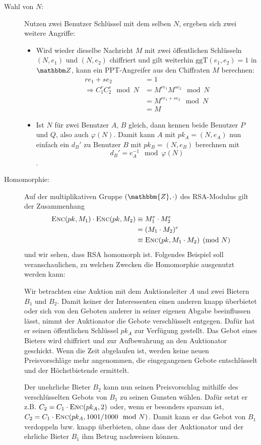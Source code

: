 \begin{description}
\item[Wahl von $N$:] 
  Nutzen zwei Benutzer Schlüssel mit dem selben $N$, ergeben sich zwei
  weitere Angriffe:
  \begin{itemize}
  \item Wird wieder dieselbe Nachricht $M$ mit zwei
    öffentlichen Schlüsseln $(N, e_1)$ und $(N, e_2)$ chiffriert und
    gilt weiterhin $\text{ggT}(e_1, e_2) = 1$ in $\Z{}$, kann ein
    PPT-Angreifer aus den Chiffraten $M$ berechnen:
    \begin{align*}
      re_1 + se_2 & = 1\\ 
      \Longrightarrow C_1^rC_2^s \mod N &= M^{re_1}M^{se_2} \mod N\\
                  &= M^{re_1 + se_2} \mod N\\
                  &= M
    \end{align*}
  \item
    Ist $N$ für zwei Benutzer $A$, $B$ gleich, dann kennen beide Benutzer $P$ und
    $Q$, also auch $\varphi(N)$. Damit kann $A$ mit $pk_A = (N, e_A)$
    nun einfach ein $d_B'$ zu Benutzer $B$ mit $pk_B = (N, e_B)$ berechnen mit \[d_B'=e_A^{-1} \mod \varphi(N)\].
  \end{itemize}    
\item[Homomorphie:] Auf der multiplikativen Gruppe $(\mathbbm{Z}, \cdot)$ des RSA-Modulus gilt der Zusammenhang
  \begin{equation*}
    \begin{split}
      \textsc{Enc}(pk, M_1) \cdot \textsc{Enc}(pk, M_2) 	&\equiv M_1^e \cdot M_2^e\\
      &= (M_1 \cdot M_2)^e\\
      &\equiv \textsc{Enc}(pk, M_1 \cdot M_2) \pmod N
    \end{split}
  \end{equation*}
  und wir sehen, dass RSA homomorph ist. 
  Folgendes Beispiel soll veranschaulichen, zu welchen Zwecken die Homomorphie ausgenutzt werden kann:   
    \begin{beispiel}
    	Wir betrachten eine Auktion mit dem Auktionsleiter $A$ und zwei Bietern $B_1$ und $B_2$. Damit keiner der Interessenten einen
    	anderen knapp überbietet oder sich von den Geboten anderer in seiner eigenen Abgabe beeinflussen lässt, nimmt der Auktionator die Gebote verschlüsselt entgegen. Dafür hat er seinen öffentlichen Schlüssel $pk_A$ zur Verfügung gestellt. Das Gebot eines Bieters wird chiffriert und zur Aufbewahrung an den Auktionator geschickt. Wenn die Zeit abgelaufen ist, werden keine neuen Preisvorschläge mehr angenommen, die eingegangenen Gebote entschlüsselt und der Höchstbietende ermittelt.
    
    	Der unehrliche Bieter $B_2$ kann nun seinen Preisvorschlag mithilfe des verschlüsselten Gebots von $B_1$ zu seinen Gunsten wählen. Dafür setzt er z.B. $C_2 =
    	C_1 \cdot \textsc{Enc}({pk_A, 2})$ oder, wenn er besonders sparsam ist, $C_2 = C_1 \cdot \textsc{Enc}({pk_A, 1001/1000 \mod N})$. Damit kann er das Gebot von $B_1$ verdoppeln
    	bzw. knapp überbieten, ohne dass der Auktionator und der ehrliche Bieter $B_1$ ihm Betrug nachweisen können.
    \end{beispiel}
\end{description} 

